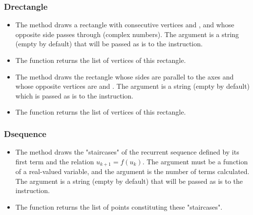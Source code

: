 \subsubsection{Drectangle}
\begin{itemize}
    \item The  method draws a rectangle with consecutive vertices  and , and whose opposite side passes through  (complex numbers). The  argument is a string (empty by default) that will be passed as is to the \drawcmd instruction.
    \item The  function returns the list of vertices of this rectangle.
    
    \item The method  draws the rectangle whose sides are parallel to the axes and whose opposite vertices are  and . ​​The argument  is a string (empty by default) which is passed as is to the \drawcmd instruction.
    
    \item The function  returns the list of vertices of this rectangle.
\end{itemize}

\subsubsection{Dsequence}
\begin{itemize}
    \item The  method draws the "staircases" of the recurrent sequence defined by its first term  and the relation \(u_{k+1}=f(u_k)\). The argument  must be a function of a real-valued variable, and the argument  is the number of terms calculated. The argument  is a string (empty by default) that will be passed as is to the \drawcmd instruction.
    \item The  function returns the list of points constituting these "staircases".
\end{itemize}

